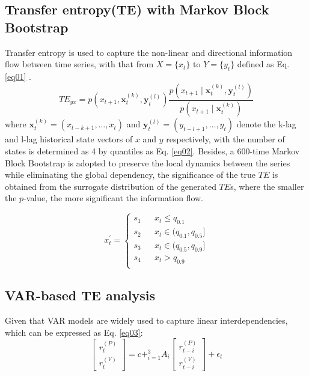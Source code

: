 \documentclass{elsarticle}
\def\log{}%
\def\sum{}%
\def\rightarrow{}%
\begin{document}
\subsection{Transfer entropy({TE}) with Markov Block Bootstrap}
Transfer entropy is used to capture the non-linear and directional information flow between time series\cite{dimpfl2013using}, with that from $X = \{x_{t}\}$ to $Y = \{y_{t}\}$ defined as Eq. \ref{eq01} \cite{TE01}.
\begin{equation} \label{eq01}
  TE_{y \rightarrow x} = \sum p(x_{t+1}, \mathbf{x}_t^{(k)}, \mathbf{y}_t^{(l)}) \log \frac{p(x_{t+1} \mid \mathbf{x}_t^{(k)}, \mathbf{y}_t^{(l)})}{p(x_{t+1} \mid \mathbf{x}_t^{(k)})}
  \end{equation}
  where $\mathbf{x}_t^{(k)} = (x_{t-k+1}, \dots, x_t)$ and $\mathbf{y}_t^{(l)} = (y_{t-l+1}, \dots, y_t)$ denote the k-lag and l-lag historical state vectors of $x$ and $y$ respectively, with the number of states is determined as 4 by quantiles as Eq. \ref{eq02}. Besides, a 600-time Markov Block Bootstrap\cite{TE03} is adopted to preserve the local dynamics between the series while eliminating the global dependency, the significance of the true $TE$ is obtained from the surrogate distribution of the generated $TE$s, where the smaller the $p$-value, the more significant the information flow.

\begin{equation}\label{eq02}
x^{'}_{t}=\left\{
\begin{array}{rcl}
s_{1}       & & {x_{t} \leq q_{0.1}}\\
s_{2}       & & {x_{t} \in (q_{0.1},q_{0.5}] }\\
s_{3}       & & {x_{t} \in (q_{0.5},q_{0.9}] }\\
s_{4}       & & {x_{t} > q_{0.9}} \\
\end{array} \right.
\end{equation}

\subsection{VAR-based TE analysis}
Given that VAR models are widely used to capture linear interdependencies, which can be expressed as Eq. \ref{eq03}:
\begin{equation} \label{eq03}
    \begin{bmatrix}
    r_t^{(P)} \\
    r_t^{(V)}
    \end{bmatrix}
    =
    c + \sum_{i=1}^{3} A_i
    \begin{bmatrix}
    r_{t-i}^{(P)} \\
    r_{t-i}^{(V)}
    \end{bmatrix}
    + \epsilon_t
    \end{equation}
\end{document}

